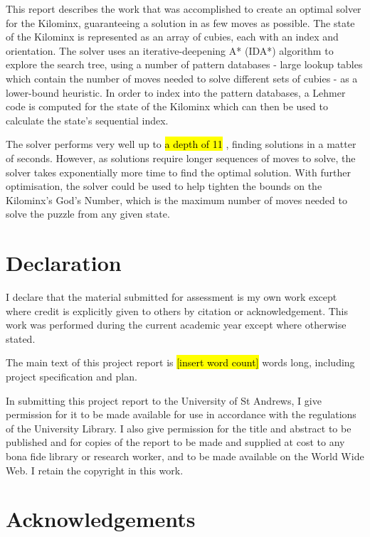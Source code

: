 \documentclass[12pt]{report}
\newcommand{\hlc}[2][yellow]{{%
    \colorlet{foo}{#1}%
    \sethlcolor{foo}\hl{#2}}%
}
\begin{document}
This report describes the work that was accomplished to create an optimal solver for the Kilominx, guaranteeing a solution in as few moves as possible. The state of the Kilominx is represented as an array of cubies, each with an index and orientation. The solver uses an iterative-deepening A* (IDA*) algorithm to explore the search tree, using a number of pattern databases - large lookup tables which contain the number of moves needed to solve different sets of cubies - as a lower-bound heuristic. In order to index into the pattern databases, a Lehmer code is computed for the state of the Kilominx which can then be used to calculate the state's sequential index.

The solver performs very well up to \hlc[yellow]{a depth of 11}, finding solutions in a matter of seconds. However, as solutions require longer sequences of moves to solve, the solver takes exponentially more time to find the optimal solution. With further optimisation, the solver could be used to help tighten the bounds on the Kilominx's God's Number, which is the maximum number of moves needed to solve the puzzle from any given state.



\chapter*{Declaration}
I declare that the material submitted for assessment is my own work except where credit is explicitly given to others by citation or acknowledgement. This work was performed during the current academic year except where otherwise stated.

The main text of this project report is \hlc[yellow]{[insert word count]} words long, including project specification and plan.

In submitting this project report to the University of St Andrews, I give permission for it to be made available for use in accordance with the regulations of the University Library. I also give permission for the title and abstract to be published and for copies of the report to be made and supplied at cost to any bona fide library or research worker, and to be made available on the World Wide Web. I retain the copyright in this work.

\chapter*{Acknowledgements}
\end{document}
